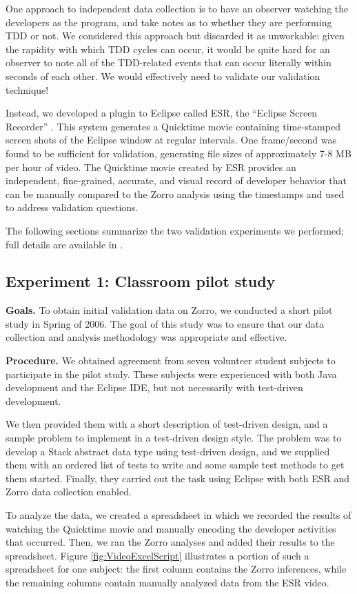 \documentclass[smallextended]{svjour3}     %
\begin{document}
One approach to independent data collection is to have an observer
watching the developers as the program, and take notes as to whether they
are performing TDD or not.  We considered this approach but discarded it as
unworkable: given the rapidity with which TDD cycles can occur, it would be
quite hard for an observer to note all of the TDD-related events that can
occur literally within seconds of each other. We would effectively need to
validate our validation technique!

Instead, we developed a plugin to Eclipse called ESR, the ``Eclipse Screen
Recorder'' \citep{esr}.  This system generates a Quicktime movie
containing time-stamped screen shots of the Eclipse window at regular
intervals. One frame/second was found to be sufficient for validation,
generating file sizes of approximately 7-8 MB per hour of video.  The
Quicktime movie created by ESR provides an independent, fine-grained,
accurate, and visual record of developer behavior that can be manually
compared to the Zorro analysis using the timestamps and used to address
validation questions.

The following sections summarize the two validation experiments we performed;
full details are available in \cite{csdl2-07-04}.

\subsection{Experiment 1: Classroom pilot study}

{\bf Goals.}  To obtain initial validation data on Zorro, we conducted a
short pilot study in Spring of 2006. The goal of this study was to ensure
that our data collection and analysis methodology was appropriate and
effective.

{\bf Procedure.}  We obtained agreement from seven volunteer student
subjects to participate in the pilot study. These subjects were experienced
with both Java development and the Eclipse IDE, but not necessarily with
test-driven development. 

We then provided them with a short description of test-driven design,
and a sample problem to implement in a test-driven design style.  The
problem was to develop a Stack abstract data type using test-driven design,
and we supplied them with an ordered list of tests to write and some sample
test methods to get them started.  Finally, they carried out the task using
Eclipse with both ESR and Zorro data collection enabled.

To analyze the data, we created a spreadsheet in which we recorded the
results of watching the Quicktime movie and manually encoding the developer
activities that occurred.  Then, we ran the Zorro analyses and added their
results to the spreadsheet.  Figure \ref{fig:VideoExcelScript} illustrates 
a portion of such a spreadsheet for one subject: the first column contains
the Zorro inferences, while the remaining columns contain manually analyzed
data from the ESR video.
\end{document}
